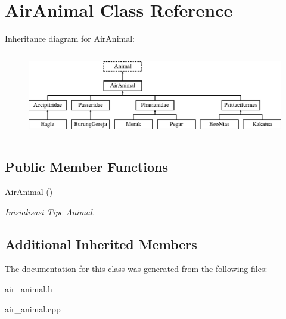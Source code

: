 \hypertarget{class_air_animal}{}\section{Air\+Animal Class Reference}
\label{class_air_animal}
Inheritance diagram for Air\+Animal\+:\begin{figure}[H]
\begin{center}
\leavevmode
\includegraphics[height=3.771044cm]{class_air_animal}
\end{center}
\end{figure}
\subsection*{Public Member Functions}
\begin{DoxyCompactItemize}
\item 
\hyperlink{class_air_animal_abcc4f2c8b0b6279c70bba4432efa25f0}{Air\+Animal} ()\hypertarget{class_air_animal_abcc4f2c8b0b6279c70bba4432efa25f0}{}\label{class_air_animal_abcc4f2c8b0b6279c70bba4432efa25f0}

\begin{DoxyCompactList}\small\item\em Inisialisasi Tipe \hyperlink{class_animal}{Animal}. \end{DoxyCompactList}\end{DoxyCompactItemize}
\subsection*{Additional Inherited Members}


The documentation for this class was generated from the following files\+:\begin{DoxyCompactItemize}
\item 
air\+\_\+animal.\+h\item 
air\+\_\+animal.\+cpp\end{DoxyCompactItemize}
